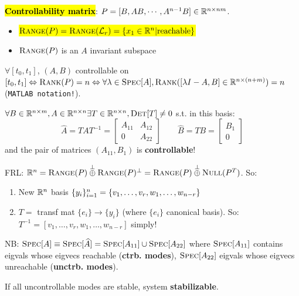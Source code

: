 \begin{Definition}
\textbf{\hl{Controllability matrix}}: $P=[B,AB,\cdots ,A^{n-1}B]\in\mathbb R^{n\times{nm}}$.
\end{Definition}
\begin{Theorem}
\begin{itemize}[leftmargin=3mm]
  \item \hspace{-1.5mm}\hl{$\textsc{Range}(P)=\textsc{Range}(\mathcal L_r)=\{x_1\in\mathbb R^n | \text{reachable}\}$}
  \item \hspace{-1.5mm}$\textsc{Range}(P)$ is an $A$ invariant subspace
\end{itemize}
\end{Theorem}
\begin{Theorem}
$\forall [t_0,t_1]$, $(A,B)$ controllable on $[t_0,t_1]\Leftrightarrow\textsc{Rank}(P)=n\Leftrightarrow\forall\lambda\in\textsc{Spec}[A],\textsc{Rank}([\lambda I-A,B]\in\mathbb R^{n\times(n+m)})=n$ (\texttt{MATLAB notation!}).
\end{Theorem}
\begin{Theorem}
$\forall B\in\mathbb R^{n\times m},A\in\mathbb R^{n\times n}\exists T\in\mathbb R^{n\times n}, \textsc{Det}[T]\ne 0$ s.t. in this basis:
\begin{equation*}
\widehat A=TAT^{-1}=\begin{bmatrix}
A_{11} & A_{12} \\
0      & A_{22}
\end{bmatrix}
\qquad\widehat B=TB=\begin{bmatrix}
B_1 \\ 0
\end{bmatrix}
\end{equation*}
and the pair of matrices $(A_{11},B_1)$ is \textbf{controllable}!

\begin{Method}
FRL: $\mathbb R^n=\textsc{Range}(P)\overset{\perp}{\oplus}\textsc{Range}(P)^\perp=\textsc{Range}(P)\overset{\perp}{\oplus}\textsc{Null}(P^T)$. So:
\begin{enumerate}[label=\protect\circled{\arabic*},leftmargin=4mm]
  \item New $\mathbb R^n$ basis $\{y_{i}\}_{i=1}^{n}=\{v_1,\ldots,v_r,w_1,\ldots,w_{n-r}\}$
  
  \item $T=$ transf mat $\{e_i\}\to\{y_i\}$ (where $\{e_i\}$ canonical basis). So:
  $T^{-1}=[v_1,\ldots,v_r,w_1,\ldots,w_{n-r}]$ simply!
\end{enumerate}
\end{Method}
\begin{Definition}
NB: $\textsc{Spec}[A]\equiv\textsc{Spec}[\widehat A]=\textsc{Spec}[A_{11}]\cup\textsc{Spec}[A_{22}]$ where $\textsc{Spec}[A_{11}]$ contains eigvals whose eigvecs reachable (\textbf{ctrb. modes}), $\textsc{Spec}[A_{22}]$ eigvals whose eigvecs unreachable (\textbf{unctrb. modes}).
\end{Definition}
\end{Theorem}
\begin{Definition}
If all uncontrollable modes are stable, system \textbf{stabilizable}.
\end{Definition}